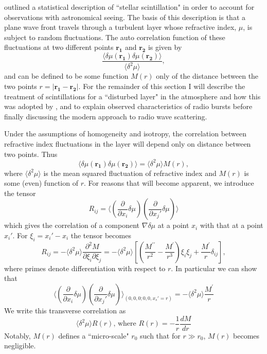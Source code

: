 \cite{Chandrasekhar1952} outlined a statistical description of ``stellar scintillation" in order to account for observations with astronomical seeing.  The basis of this description is that a plane wave front travels through a turbulent layer whose refractive index, $\mu$, is subject to random fluctuations. The auto correlation function of these fluctuations at two different points $\mathbf{r_1}$ and $\mathbf{r_2}$ is given by
$$
\frac{\langle \delta \mu(\mathbf{r_1}) \delta \mu(\mathbf{r_2}) \rangle}{\langle \delta^2 \mu \rangle}, 
$$
and can be defined to be some function $M(r)$ only of the distance between the two points $r = \vert \mathbf{r_1} - \mathbf{r_2} \vert$. For the remainder of this section I will describe the \cite{Chandrasekhar1952} treatment of scintillations for a ``disturbed layer" in the atmosphere and how this was adopted by \cite{Fokker1965}, \cite{Steinberg1971} and \cite{Riddle1974} to explain observed characteristics of radio bursts before finally discussing the modern approach to radio wave scattering.

Under the assumptions of homogeneity and isotropy, the correlation between refractive index fluctuations in the layer will depend only on distance between two points. Thus
\begin{equation}
\label{eq:scattering_correlation}
\langle \delta \mu(\mathbf{r_1}) \delta \mu(\mathbf{r_2}) \rangle = \langle \delta^2 \mu \rangle M(r),
\end{equation}
where $\langle \delta^2 \mu \rangle$ is the mean squared fluctuation of refractive index and $M(r)$ is some (even) function of $r$. For reasons that will become apparent, we introduce the tensor
\begin{equation}
\label{eq:scattering_tensor}
R_{ij} = \bigg \langle \left( \frac{\partial}{\partial x_i} \delta \mu \right) \left( \frac{\partial}{\partial {x_j}' } \delta \mu \right) \bigg \rangle
\end{equation}
which gives the correlation of a component $\nabla \delta \mu$ at a point $x_i$ with that at a point ${x_i}'$. For $\xi_i = {x_i}' - x_i$ the tensor becomes
\begin{equation}
\label{eq:scattering_tensor2}
R_{ij} = - \langle \delta^2 \mu \rangle \frac{\partial^2 M}{\partial \xi_i \partial \xi_j} = - \langle \delta^2 \mu \rangle \left[\left(\frac{M^{\prime\prime}}{r^2} - \frac{M^ \prime}{r^3}\right) \xi_i \xi_j + \frac{M^\prime}{r}\delta_{ij}\right],
\end{equation} 
where primes denote differentiation with respect to $r$.  In particular we can show that
\begin{equation}
\label{eq:scattering_transverse_correlation}
\bigg \langle \left( \frac{\partial}{\partial x_i} \delta \mu \right) \left( \frac{\partial}{\partial {x_j}' } \delta \mu \right) \bigg \rangle_{(0,0,0;0,0,{x_s}'=r)} = - \langle \delta^2 \mu \rangle \frac{M^\prime}{r}
\end{equation}
We write this transverse correlation  as 
\begin{equation}
\langle \delta^2 \mu \rangle R(r) \mbox{, where } R(r) = - \frac{1}{r} \frac{dM}{dr}
\end{equation}
 Notably, $M(r)$ defines a ``micro-scale" $r_0$ such that for $r \gg r_0$, $M(r)$ becomes negligible.	
 
